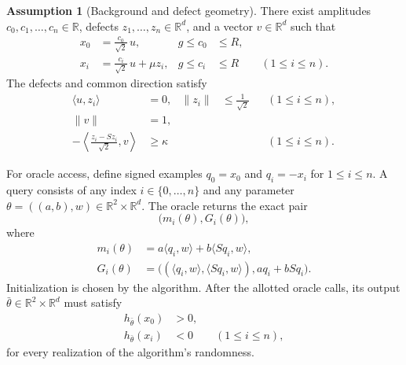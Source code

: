\documentclass[10pt]{article}
\theoremstyle{definition}
\newtheorem{assumption}{Assumption}
\begin{document}
\begin{assumption}[Background and defect geometry]
There exist amplitudes $c_0,c_1,\ldots,c_n\in\mathbb{R}$, defects $z_1,\ldots,z_n\in\mathbb{R}^d$, and a vector $v\in\mathbb{R}^d$ such that
\[
\begin{aligned}
x_0&=\frac{c_0}{\sqrt2}\,u,
&g\leq c_0&\leq R,\\
x_i&=\frac{c_i}{\sqrt2}\,u+\mu z_i,
&g\leq c_i&\leq R
\qquad (1\leq i\leq n).
\end{aligned}
\]
The defects and common direction satisfy
\[
\begin{aligned}
\langle u,z_i\rangle&=0,
&\|z_i\|&\leq\frac{1}{\sqrt2}
&& (1\leq i\leq n),\\
\|v\|&=1,\\
-\left\langle\frac{z_i-Sz_i}{\sqrt2},v\right\rangle
&\geq\kappa
&&&& (1\leq i\leq n).
\end{aligned}
\]
\end{assumption}

For oracle access, define signed examples $q_0=x_0$ and $q_i=-x_i$ for $1\leq i\leq n$. A query consists of any index $i\in\{0,\ldots,n\}$ and any parameter $\theta=((a,b),w)\in\mathbb{R}^2\times\mathbb{R}^d$. The oracle returns the exact pair
\[
\bigl(m_i(\theta),G_i(\theta)\bigr),
\]
where
\[
\begin{aligned}
m_i(\theta)&=a\langle q_i,w\rangle+b\langle Sq_i,w\rangle,\\
G_i(\theta)&=\bigl((\langle q_i,w\rangle,\langle Sq_i,w\rangle),
                    a q_i+b Sq_i\bigr).
\end{aligned}
\]
Initialization is chosen by the algorithm. After the allotted oracle calls, its output $\bar\theta\in\mathbb{R}^2\times\mathbb{R}^d$ must satisfy
\[
\begin{aligned}
h_{\bar\theta}(x_0)&>0,\\
h_{\bar\theta}(x_i)&<0\qquad (1\leq i\leq n),
\end{aligned}
\]
for every realization of the algorithm's randomness.
\end{document}
